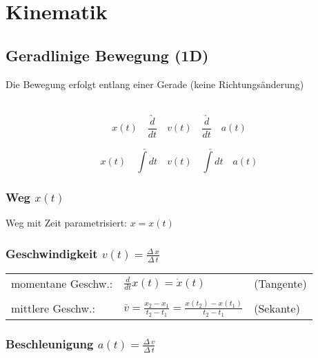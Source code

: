 \section{Kinematik}
			
	\subsection{Geradlinige Bewegung (1D)}
		Die Bewegung erfolgt entlang einer Gerade (keine Richtungsänderung) \\
		\\
		\begin{minipage}{0.48\linewidth}
			\begin{equation*}
				x(t) \quad  \underrightarrow{ \frac{d}{dt}} \quad  v(t) \quad  \underrightarrow{ \frac{d}{dt}} \quad a(t)  
			\end{equation*}
		\end{minipage}
		\hfill
		\begin{minipage}{0.48\linewidth}
			\begin{equation*}
				x(t) \quad \underleftarrow{\int dt} \quad v(t) \quad \underleftarrow{\int dt} \quad a(t)
			\end{equation*}
		\end{minipage}

		\subsubsection{Weg $x(t)$}
			Weg mit Zeit parametrisiert: $x = x(t)$ 

		\subsubsection{Geschwindigkeit $v(t) = \frac{\Delta \, x}{\Delta \, t}$}
		
			\begin{tabular}{lll}
				momentane Geschw.: & $\frac{d}{dt} x(t) = \dot{x}(t)$ & (Tangente) \\	
				\\
				mittlere Geschw.: & $\overline{v} = \frac{x_2 -x_1}{t_2 - t_1} =  \frac{x(t_2) - x(t_1)}{t_2 - t_1} $  & (Sekante) \\
			\end{tabular}

		\subsubsection{Beschleunigung $a(t) = \frac{\Delta \, v}{\Delta \, t}$}
			
